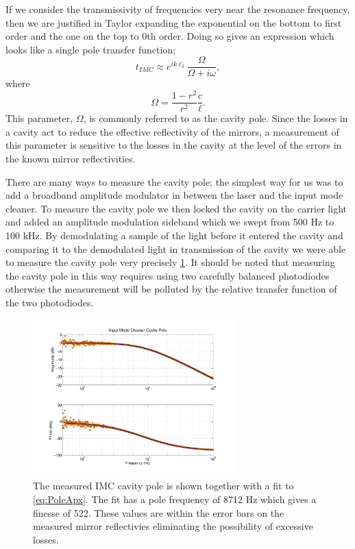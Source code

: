 \documentclass[10pt,a4paper]{article}
\begin{document}
If we consider the transmissivity of frequencies very near the resonance frequency, 
then we are justified in Taylor expanding the exponential on the bottom to first order 
and the one on the top to 0th order.
Doing so gives an expression which looks like a single pole transfer function;
\begin{equation}
	t_{IMC}\approx e^{ik\ell_3}\frac{\Omega}{\Omega+i\omega},
	\label{eq:PoleApx}
\end{equation}
where
\begin{equation}
	\Omega=\frac{1-r^2}{r^2}\frac{c}{\ell}.
\end{equation}
This parameter, $\Omega$, is commonly referred to as the cavity pole.  
Since the losses in a cavity act to reduce the effective reflectivity of the mirrors, 
a measurement of this parameter is sensitive to the losses in the cavity at the level 
of the errors in the known mirror reflectivities.

There are many ways to measure the cavity pole; 
the simplest way for us was to add a broadband amplitude modulator in between the laser 
and the input mode cleaner.  
To measure the cavity pole we then locked the cavity on the carrier light and added 
an amplitude modulation sideband which we swept from 500 Hz to 100 kHz.  
By demodulating a sample of the light before it entered the cavity and comparing 
it to the demodulated light in transmission of the cavity we were able to 
measure the cavity pole very precisely \ref{fig:cavPole}.  
It should be noted that measuring the cavity pole in this way requires using two 
carefully balanced photodiodes otherwise the measurement will be polluted by the 
relative transfer function of the two photodiodes.

\begin{figure}	
	\centering
	\includegraphics[width = 0.7\textwidth, trim = 2.5cm 1.5cm 2.5cm 1cm]{Cavity_Pole.pdf}
	\caption{The measured IMC cavity pole is shown together with a fit 
		to \eqref{eq:PoleApx}.  The fit has a pole frequency of 8712 Hz 
		which gives a finesse of 522.  These values are within the error 
		bars on the measured mirror reflectivies eliminating the 
		possibility of excessive losses.}
	\label{fig:cavPole}
\end{figure}
\end{document}
